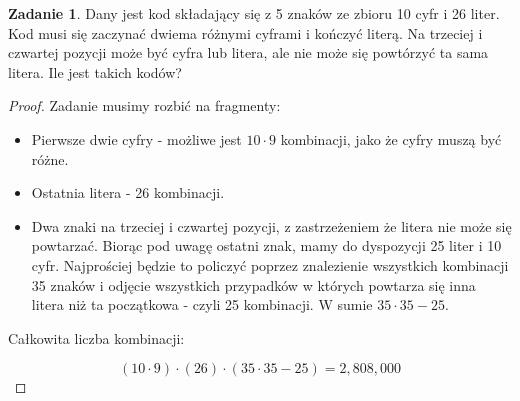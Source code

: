 \documentclass[11pt]{article}
\theoremstyle{definition}
\newtheorem{zadanie}{Zadanie}
\numberwithin{zadanie}{subsection}
\begin{document}
\begin{zadanie}
    Dany jest kod składający się z 5 znaków ze zbioru 10 cyfr i 26 liter.
    Kod musi się zaczynać dwiema różnymi cyframi i kończyć literą. Na trzeciej i czwartej pozycji może być cyfra lub litera, ale nie może się powtórzyć ta sama litera. Ile jest takich kodów?
\end{zadanie}
\begin{proof}
    Zadanie musimy rozbić na fragmenty:
    \begin{itemize}
        \item Pierwsze dwie cyfry - możliwe jest $10\cdot 9$ kombinacji, jako że cyfry muszą być różne.
        \item Ostatnia litera - 26 kombinacji.
        \item Dwa znaki na trzeciej i czwartej pozycji, z zastrzeżeniem że litera nie może się powtarzać. Biorąc pod uwagę ostatni znak, mamy do dyspozycji 25 liter i 10 cyfr. Najprościej będzie to policzyć poprzez znalezienie wszystkich kombinacji 35 znaków i odjęcie wszystkich przypadków w których powtarza się inna litera niż ta początkowa - czyli 25 kombinacji. W sumie $35\cdot 35 - 25$.
    \end{itemize}

    Całkowita liczba kombinacji:

    $$(10\cdot 9)\cdot (26)\cdot(35\cdot35-25) = 2,808,000$$
\end{proof}
\end{document}
